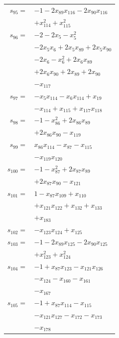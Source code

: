 \begin{longtable}{@{}r@{\;}l@{}}
\(s_{95}=\) & \(\displaystyle -1 -2x_{89}x_{116} -2x_{90}x_{116}\) \\
 & \(\displaystyle +x_{114}^{2} +x_{115}^{2}\) \\[3pt]
\(s_{96}=\) & \(\displaystyle -2 -2x_{5} -x_{5}^{2}\) \\
 & \(\displaystyle -2x_{5}x_{6} +2x_{5}x_{89} +2x_{5}x_{90}\) \\
 & \(\displaystyle -2x_{6} -x_{6}^{2} +2x_{6}x_{89}\) \\
 & \(\displaystyle +2x_{6}x_{90} +2x_{89} +2x_{90}\) \\
 & \(\displaystyle -x_{117}\) \\[3pt]
\(s_{97}=\) & \(\displaystyle -x_{5}x_{114} -x_{6}x_{114} +x_{19}\) \\
 & \(\displaystyle -x_{114} +x_{115} +x_{117}x_{118}\) \\[3pt]
\(s_{98}=\) & \(\displaystyle -1 -x_{86}^{2} +2x_{86}x_{89}\) \\
 & \(\displaystyle +2x_{86}x_{90} -x_{119}\) \\[3pt]
\(s_{99}=\) & \(\displaystyle x_{86}x_{114} -x_{87} -x_{115}\) \\
 & \(\displaystyle -x_{119}x_{120}\) \\[3pt]
\(s_{100}=\) & \(\displaystyle -1 -x_{87}^{2} +2x_{87}x_{89}\) \\
 & \(\displaystyle +2x_{87}x_{90} -x_{121}\) \\[3pt]
\(s_{101}=\) & \(\displaystyle 1 -x_{87}x_{109} +x_{110}\) \\
 & \(\displaystyle +x_{121}x_{122} +x_{132} +x_{133}\) \\
 & \(\displaystyle +x_{183}\) \\[3pt]
\(s_{102}=\) & \(\displaystyle -x_{123}x_{124} +x_{125}\) \\[3pt]
\(s_{103}=\) & \(\displaystyle -1 -2x_{89}x_{125} -2x_{90}x_{125}\) \\
 & \(\displaystyle +x_{123}^{2} +x_{124}^{2}\) \\[3pt]
\(s_{104}=\) & \(\displaystyle -1 +x_{87}x_{123} -x_{121}x_{126}\) \\
 & \(\displaystyle -x_{124} -x_{160} -x_{161}\) \\
 & \(\displaystyle -x_{167}\) \\[3pt]
\(s_{105}=\) & \(\displaystyle -1 +x_{87}x_{114} -x_{115}\) \\
 & \(\displaystyle -x_{121}x_{127} -x_{172} -x_{173}\) \\
 & \(\displaystyle -x_{178}\) \\[3pt]

\end{longtable}
